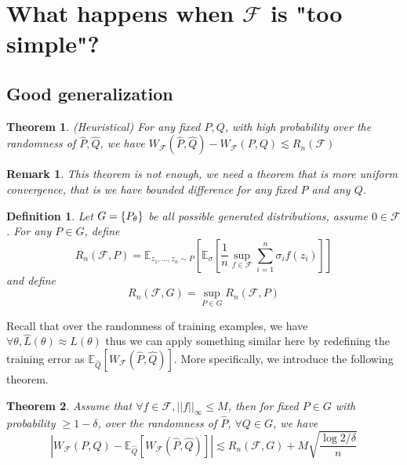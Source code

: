 \documentclass[11pt]{article}
\DeclarePairedDelimiter\set{\{}{\}}
\newcommand{\cF}{\mathcal{F}}
\newtheorem{theorem}{Theorem}
\newtheorem{remark}{Remark}
\newtheorem{definition}{Definition}
\begin{document}
\section{What happens when $\cF$ is "too simple"?}
\subsection{Good generalization}
\begin{theorem}(Heuristical) For any fixed $P,Q$, with high probability over the randomness of $\hat{P},\hat{Q}$, we have  $W_{\cF}(\hat{P},\hat{Q})-W_{\cF}(P,Q)\lesssim R_n(\cF)$
\end{theorem}
\begin{remark}
This theorem is not enough, we need a theorem that is more uniform convergence, that is we have bounded difference for any fixed $P$ and any $Q$.
\end{remark}
\begin{definition}
Let $G=\set{P_{\theta}}$ be all possible generated distributions, assume $0\in \cF$. For any $P\in G$, define 
$$R_n(\cF,P)=\mathbb{E}_{z_1,...,z_n\sim P}[\mathbb{E}_{\sigma}[\frac{1}{n}\sup_{f\in\cF}\sum_{i=1}^n\sigma_if(z_i)]]$$
and define 
$$R_n(\cF,G)=\sup_{P\in G}R_n(\cF,P)$$
\end{definition}
\noindent Recall that over the randomness of training examples, we have $\forall \theta, \hat{L}(\theta)\approx L(\theta)$ thus we can apply something similar here by redefining the training error as $\mathbb{E}_{\hat{Q}}[W_{\cF}(\hat{P},\hat{Q})]$. More specifically, we introduce the following theorem.
\begin{theorem}
Assume that $\forall f\in \cF, ||f||_{\infty}\leq M$, then for fixed $P\in G$ with probability $\geq 1-\delta$, over the randomness of $\hat{P}$, $\forall Q\in G$, we have
$$|W_{\cF}(P,Q)-\mathbb{E}_{\hat{Q}}[W_{\cF}(\hat{P},\hat{Q})]|\lesssim R_n(\cF,G)+M\sqrt{\frac{\log 2/\delta}{n}}$$
\end{theorem}
\end{document}
